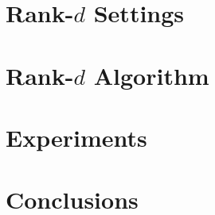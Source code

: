 \documentclass{article}
\begin{document}
\section{Rank-$d$ Settings}
\label{sec:setting}


\section{Rank-$d$ Algorithm}
\label{sec:algorithm}


\section{Experiments}
\label{sec:experiments}


%

\section{Conclusions}
\label{sec:conclusions}





%
\end{document}
